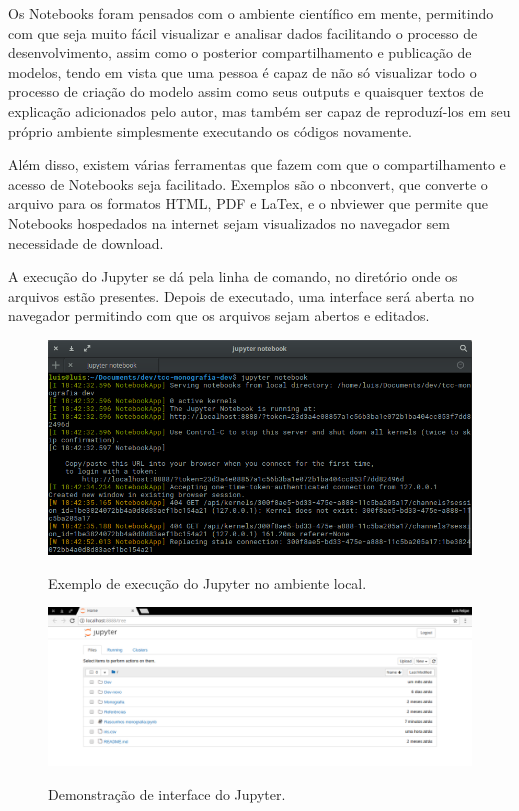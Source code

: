Os Notebooks foram pensados com o ambiente científico em mente, permitindo com que seja muito fácil visualizar e analisar dados facilitando o processo de desenvolvimento, assim como o posterior compartilhamento e publicação de modelos, tendo em vista que uma pessoa é capaz de não só visualizar todo o processo de criação do modelo assim como seus outputs e quaisquer textos de explicação adicionados pelo autor, mas também ser capaz de reproduzí-los em seu próprio ambiente simplesmente executando os códigos novamente.

Além disso, existem várias ferramentas que fazem com que o compartilhamento e acesso de Notebooks seja facilitado. Exemplos são o nbconvert, que converte o arquivo para os formatos HTML, PDF e LaTex, e o nbviewer que permite que Notebooks hospedados na internet sejam visualizados no navegador sem necessidade de download.

A execução do Jupyter se dá pela linha de comando, no diretório onde os arquivos estão presentes. Depois de executado, uma interface será aberta no navegador permitindo com que os arquivos sejam abertos e editados.

\begin{figure}[h]
\caption{\small Exemplo de execução do Jupyter no ambiente local.}
\centering
\includegraphics[scale=0.40]{figs/exemplo-jupyterutil.png}
\label{f.exemplo-jupyterlocal}
\end{figure}

\begin{figure}[h]
\caption{\small Demonstração de interface do Jupyter.}
\centering
\includegraphics[scale=0.25]{figs/exemplo-jupyterinterface1.png}
\label{f.exemplo-jupyterinterface}
\end{figure}

